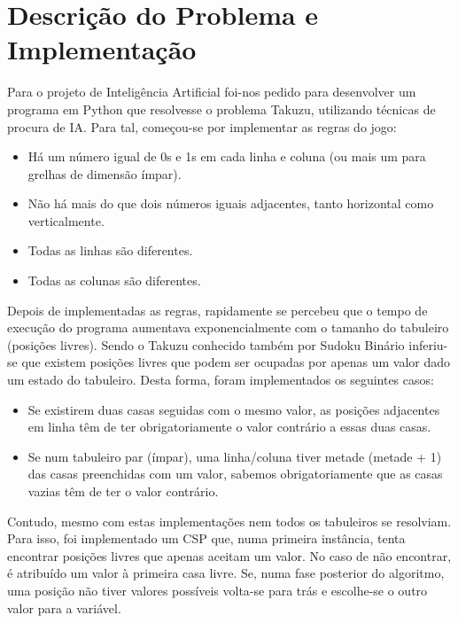 \documentclass[12pt,a4paper]{article}
\begin{document}
  \section{Descrição do Problema e Implementação}

  Para o projeto de Inteligência Artificial foi-nos pedido para desenvolver um programa em Python que resolvesse o problema Takuzu, utilizando técnicas de procura de IA.
  Para tal, começou-se por implementar as regras do jogo:

  \begin{itemize}
    \setlength{\itemsep}{0pt}
    \item Há um número igual de 0s e 1s em cada linha e coluna (ou mais um para grelhas de
    dimensão ímpar).
    \item Não há mais do que dois números iguais adjacentes, tanto horizontal como verticalmente.
    \item Todas as linhas são diferentes.
    \item Todas as colunas são diferentes.
  \end{itemize}

  Depois de implementadas as regras, rapidamente se percebeu que o tempo de execução do programa aumentava exponencialmente com o tamanho do tabuleiro (posições livres).
  Sendo o Takuzu conhecido também por Sudoku Binário inferiu-se que existem posições livres que podem ser ocupadas por apenas um valor dado um estado do tabuleiro. 
  Desta forma, foram implementados os seguintes casos:
  \begin{itemize}
    \setlength{\itemsep}{0pt}
    \item Se existirem duas casas seguidas com o mesmo valor, as posições adjacentes em linha têm de ter obrigatoriamente o valor contrário a essas duas casas.
    \item Se num tabuleiro par (ímpar), uma linha/coluna tiver metade (metade + 1) das casas preenchidas com um valor, sabemos obrigatoriamente que as casas vazias têm de ter o valor contrário. 
  \end{itemize}

  Contudo, mesmo com estas implementações nem todos os tabuleiros se resolviam.
  Para isso, foi implementado um CSP que, numa primeira instância, tenta encontrar posições livres que apenas aceitam um valor.
  No caso de não encontrar, é atribuído um valor à primeira casa livre.
  Se, numa fase posterior do algoritmo, uma posição não tiver valores possíveis volta-se para trás e escolhe-se o outro valor para a variável.
\end{document}
